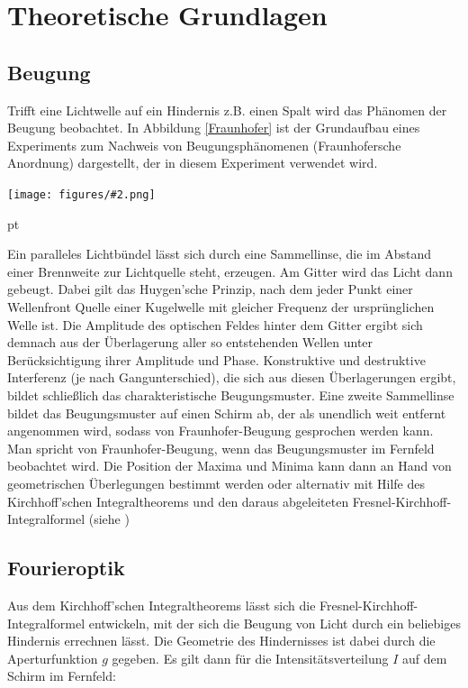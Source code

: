 \documentclass[12pt]{article}
\newcommand{\gra}[3][0.7]{
	\begin{minipage}[h!]{\textwidth}
		\centering
		\texttt{[image: figures/\#2.png]}
		\captionof{figure}{#3}
	\end{minipage}
	\vskip 30 pt
}
\begin{document}
\newpage
\section{Theoretische Grundlagen}

\subsection{Beugung}

Trifft eine Lichtwelle auf ein Hindernis z.B. einen Spalt wird das Phänomen der Beugung beobachtet. In Abbildung \ref{Fraunhofer} ist  der Grundaufbau eines Experiments zum Nachweis von Beugungsphänomenen (Fraunhofersche Anordnung) dargestellt, der in diesem Experiment verwendet wird. 

\gra{Fraunhofer}{Fraunhofersche Anordnung \label{Fraunhofer}}   

Ein paralleles Lichtbündel lässt sich durch eine Sammellinse, die im Abstand einer Brennweite zur Lichtquelle steht, erzeugen. Am Gitter wird das Licht dann gebeugt. Dabei gilt das Huygen'sche Prinzip, nach dem jeder Punkt einer Wellenfront Quelle einer Kugelwelle mit gleicher Frequenz der ursprünglichen Welle ist. Die Amplitude des optischen Feldes hinter dem Gitter ergibt sich demnach aus der Überlagerung aller so entstehenden Wellen unter Berücksichtigung ihrer Amplitude und Phase. Konstruktive und destruktive Interferenz (je nach Gangunterschied), die sich aus diesen Überlagerungen ergibt, bildet schließlich das charakteristische Beugungsmuster. Eine zweite Sammellinse bildet das Beugungsmuster auf einen Schirm ab, der als unendlich weit entfernt angenommen wird, sodass von Fraunhofer-Beugung gesprochen werden kann. Man spricht von Fraunhofer-Beugung, wenn das Beugungsmuster im Fernfeld beobachtet wird. Die Position der Maxima und Minima kann dann an Hand von geometrischen Überlegungen bestimmt werden oder alternativ mit Hilfe des Kirchhoff'schen Integraltheorems und den daraus abgeleiteten Fresnel-Kirchhoff-Integralformel (siehe \label{Fourier})

\subsection{Fourieroptik}  

Aus dem  Kirchhoff'schen Integraltheorems lässt sich die Fresnel-Kirchhoff-Integralformel entwickeln, mit der sich die Beugung von Licht durch ein beliebiges Hindernis errechnen lässt. Die Geometrie des Hindernisses ist dabei durch die Aperturfunktion $g$ gegeben. Es gilt dann für die Intensitätsverteilung $I$ auf dem Schirm im Fernfeld: 
\end{document}
